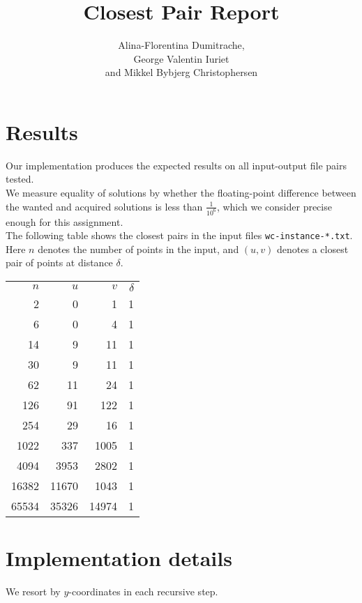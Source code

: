 \documentclass{article}
\title{Closest Pair Report}
\author{Alina-Florentina Dumitrache, \\George Valentin Iuriet \\and Mikkel Bybjerg Christophersen}
\begin{document}
  \maketitle

  \section{Results}

  Our implementation produces the expected results on all input-output file pairs tested.\\
  We measure equality of solutions by whether the floating-point difference between the wanted and acquired solutions is less than $\frac{1}{10^6}$, which we consider precise enough for this assignment. \\

  The following table shows the closest pairs in the input files {\tt wc-instance-*.txt}.
  Here $n$ denotes the number of points in the input,
  and $(u,v)$ denotes a closest pair of points at distance $\delta$.

  \bigskip\noindent
  \begin{tabular}{rrrr}
    $n$ & $u$ & $v$ & $\delta$ \\
    2 & 0 & 1 & 1 \\
    6 & 0 & 4 & 1 \\
    14 & 9 & 11 & 1 \\
    30 & 9 & 11 & 1 \\
    62 & 11 & 24 & 1 \\
    126 & 91 & 122 & 1 \\
    254 & 29 & 16 & 1 \\
    1022 & 337 & 1005 & 1 \\
    4094 & 3953 & 2802 & 1 \\
    16382 & 11670 & 1043 & 1 \\
    65534 & 35326 & 14974 & 1 \\
  \end{tabular}


  \section{Implementation details}

  We resort by $y$-coordinates in each recursive step.
\end{document}
